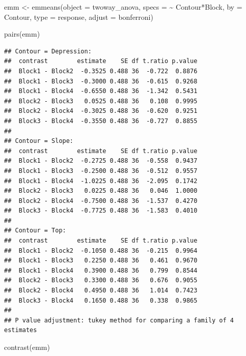\documentclass[
]{book}
\newenvironment{Shaded}{\begin{snugshade}}{\end{snugshade}}
\newcommand{\AttributeTok}[1]{\textcolor[rgb]{0.77,0.63,0.00}{#1}}
\newcommand{\FunctionTok}[1]{\textcolor[rgb]{0.00,0.00,0.00}{#1}}
\newcommand{\NormalTok}[1]{#1}
\newcommand{\OtherTok}[1]{\textcolor[rgb]{0.56,0.35,0.01}{#1}}
\newcommand{\SpecialCharTok}[1]{\textcolor[rgb]{0.00,0.00,0.00}{#1}}
\newcommand{\StringTok}[1]{\textcolor[rgb]{0.31,0.60,0.02}{#1}}
\begin{document}
\begin{Shaded}
\begin{Highlighting}[]
\NormalTok{emm }\OtherTok{\textless{}{-}} \FunctionTok{emmeans}\NormalTok{(}\AttributeTok{object =}\NormalTok{ twoway\_anova,}
                     \AttributeTok{specs =} \SpecialCharTok{\textasciitilde{}}\NormalTok{ Contour}\SpecialCharTok{*}\NormalTok{Block,}
                     \AttributeTok{by =} \StringTok{\textquotesingle{}Contour\textquotesingle{}}\NormalTok{, }
                     \AttributeTok{type =} \StringTok{\textquotesingle{}response\textquotesingle{}}\NormalTok{,}
                     \AttributeTok{adjust =} \StringTok{\textquotesingle{}bonferroni\textquotesingle{}}\NormalTok{)}


\FunctionTok{pairs}\NormalTok{(emm)}
\end{Highlighting}
\end{Shaded}

\begin{verbatim}
## Contour = Depression:
##  contrast        estimate    SE df t.ratio p.value
##  Block1 - Block2  -0.3525 0.488 36  -0.722  0.8876
##  Block1 - Block3  -0.3000 0.488 36  -0.615  0.9268
##  Block1 - Block4  -0.6550 0.488 36  -1.342  0.5431
##  Block2 - Block3   0.0525 0.488 36   0.108  0.9995
##  Block2 - Block4  -0.3025 0.488 36  -0.620  0.9251
##  Block3 - Block4  -0.3550 0.488 36  -0.727  0.8855
## 
## Contour = Slope:
##  contrast        estimate    SE df t.ratio p.value
##  Block1 - Block2  -0.2725 0.488 36  -0.558  0.9437
##  Block1 - Block3  -0.2500 0.488 36  -0.512  0.9557
##  Block1 - Block4  -1.0225 0.488 36  -2.095  0.1742
##  Block2 - Block3   0.0225 0.488 36   0.046  1.0000
##  Block2 - Block4  -0.7500 0.488 36  -1.537  0.4270
##  Block3 - Block4  -0.7725 0.488 36  -1.583  0.4010
## 
## Contour = Top:
##  contrast        estimate    SE df t.ratio p.value
##  Block1 - Block2  -0.1050 0.488 36  -0.215  0.9964
##  Block1 - Block3   0.2250 0.488 36   0.461  0.9670
##  Block1 - Block4   0.3900 0.488 36   0.799  0.8544
##  Block2 - Block3   0.3300 0.488 36   0.676  0.9055
##  Block2 - Block4   0.4950 0.488 36   1.014  0.7423
##  Block3 - Block4   0.1650 0.488 36   0.338  0.9865
## 
## P value adjustment: tukey method for comparing a family of 4 estimates
\end{verbatim}

\begin{Shaded}
\begin{Highlighting}[]
\FunctionTok{contrast}\NormalTok{(emm)}
\end{Highlighting}
\end{Shaded}
\end{document}
